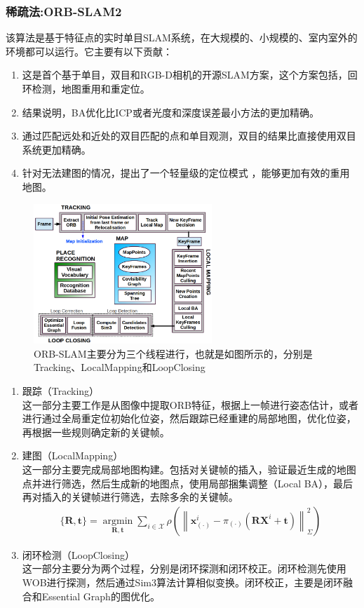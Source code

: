 \documentclass[cs4size,a4paper]{ctexart}
\numberwithin{equation}{section}
\numberwithin{table}{section}
\numberwithin{figure}{section}
\begin{document}
\subsubsection{稀疏法:ORB-SLAM2}
该算法\cite{murORB2}是基于特征点的实时单目SLAM系统，在大规模的、小规模的、室内室外的环境都可以运行。它主要有以下贡献：
\begin{enumerate}[1)]
        \item 这是首个基于单目，双目和RGB-D相机的开源SLAM方案，这个方案包括，回环检测，地图重用和重定位。
        \item 结果说明，BA优化比ICP或者光度和深度误差最小方法的更加精确。
        \item 通过匹配远处和近处的双目匹配的点和单目观测，双目的结果比直接使用双目系统更加精确。
        \item 针对无法建图的情况，提出了一个轻量级的定位模式 ，能够更加有效的重用地图。
\end{enumerate}

\begin{figure}[H]
        \centering
        \includegraphics[width=0.6\textwidth]{figure/orb.png}
        \caption{ORB-SLAM主要分为三个线程进行，也就是如图所示的，分别是Tracking、LocalMapping和LoopClosing\cite{murORB2}}
    \end{figure}

\begin{enumerate}
        \item 跟踪（Tracking）\\ 这一部分主要工作是从图像中提取ORB特征，根据上一帧进行姿态估计，或者进行通过全局重定位初始化位姿，然后跟踪已经重建的局部地图，优化位姿，再根据一些规则确定新的关键帧。
        \item 建图（LocalMapping）\\ 这一部分主要完成局部地图构建。包括对关键帧的插入，验证最近生成的地图点并进行筛选，然后生成新的地图点，使用局部捆集调整（Local BA），最后再对插入的关键帧进行筛选，去除多余的关键帧。
        \begin{align}
                \{\mathbf{R}, \mathbf{t}\}=\underset{\mathbf{R}, \mathbf{t}}{\operatorname{argmin}} \sum_{i \in \mathcal{X}} \rho\left(\left\|\mathbf{x}_{(\cdot)}^{i}-\pi_{(\cdot)}\left(\mathbf{R} \mathbf{X}^{i}+\mathbf{t}\right)\right\|_{\Sigma}^{2}\right)
        \end{align}
        \item 闭环检测（LoopClosing）\\ 这一部分主要分为两个过程，分别是闭环探测和闭环校正。闭环检测先使用WOB进行探测，然后通过Sim3算法计算相似变换。闭环校正，主要是闭环融合和Essential Graph的图优化。
\end{enumerate}
\end{document}
